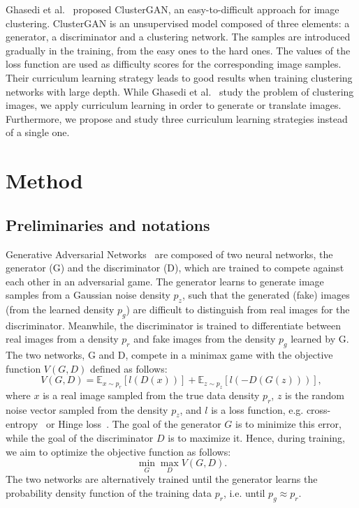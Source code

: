 \documentclass[10pt,twocolumn,letterpaper]{article}
\begin{document}
Ghasedi et al.~\cite{Ghasedi-CVPR-2019} proposed ClusterGAN, an easy-to-difficult approach for image clustering. ClusterGAN is an unsupervised model composed of three elements: a generator, a discriminator and a clustering network. The samples are introduced gradually in the training, from the easy ones to the hard ones. The values of the loss function are used as difficulty scores for the corresponding image samples. Their curriculum learning strategy leads to good results when training clustering networks with large depth. While Ghasedi et al.~\cite{Ghasedi-CVPR-2019} study the problem of clustering images, we apply curriculum learning in order to generate or translate images. Furthermore, we propose and study three curriculum learning strategies instead of a single one.

\vspace{-0.1cm}
\section{Method}
\label{sec_Method}
\vspace{-0.1cm}
\subsection{Preliminaries and notations}
\vspace{-0.1cm}

Generative Adversarial Networks~\cite{Goodfellow-NIPS-2014} are composed of two neural networks, the generator (G) and the discriminator (D), which are trained to compete against each other in an adversarial game. The generator learns to generate image samples from a Gaussian noise density $p_z$, such that the generated (fake) images (from the learned density $p_g$) are difficult to distinguish from real images for the discriminator. Meanwhile, the discriminator is trained to differentiate between real images from a density $p_r$ and fake images from the density $p_g$ learned by G. The two networks, G and D, compete in a minimax game with the objective function $V(G, D)$ defined as follows:
\begin{equation}\label{eq_gan}
V(G,D) = \mathbb{E}_{x \sim p_r}[l(D(x))] + \mathbb{E}_{z \sim p_z}[l(-D(G(z)))],
\end{equation}
where $x$ is a real image sampled from the true data density $p_r$, $z$ is the random noise vector sampled from the density $p_z$, and $l$ is a loss function, e.g. cross-entropy~\cite{Goodfellow-NIPS-2014} or Hinge loss~\cite{Miyato-ICLR-2018}. The goal of the generator $G$ is to minimize this error, while the goal of the discriminator $D$ is to maximize it. Hence, during training, we aim to optimize the objective function as follows:
\begin{equation}
\min_{G} \max_{D} V(G,D).
\end{equation}
The two networks are alternatively trained until the generator learns the probability density function of the training data $p_r$, i.e. until $p_g \approx p_r$.
\end{document}
